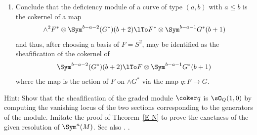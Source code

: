 \begin{exercise}
\begin{enumerate}
\item Conclude that the deficiency module of a curve of type $(a, b)$ with $a\leq b$ is the cokernel of a map
$$
\wedge^2 F^* \otimes \Sym^{b-a-2} (G^*)(b+2) \lTo F^*\otimes \Sym^{b-a-1} G^*(b+1)
$$
and thus, after choosing a basis of $F = S^2$, may be identified as the sheafification of the cokernel of
$$
\Sym^{b-a-2} (G^*)(b+2) \lTo F\otimes \Sym^{b-a-1} G^*(b+1)
$$
where the map is the action of $F$ on $\wedge G^*$ via the map $q: F\to G$.
\end{enumerate}
 Hint: Show that the sheafification of the graded module $\coker q$ is $\sO_Q(1,0)$ by computing the vanishing locus
of the two sections corresponding to the generators of the module. Imitate the proof of Theorem~\ref{E-N} to prove
the exactness of the given resolution of $\Sym^a(M)$. See also \cite[Appendix ****]{Eisenbud1995}. .
\end{exercise}





%
%
%
%
